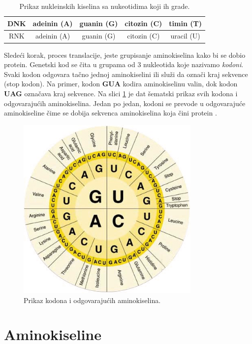 \begin{table}[H]
	\centering
	\begin{tabular}{|c|c|c|c|c|}
		\hline
		DNK & adeinin (A) & guanin (G) & citozin (C) & timin (T) \\
		\hline
		RNK & adeinin (A) & guanin (G) & citozin (C) & uracil (U) \\
		\hline             
	\end{tabular}
	\caption{Prikaz nukleinskih kiselina sa nukeotidima koji ih grade.}
	\label{tab: nucleotides}
\end{table}


Sledeći korak, proces translacije, jeste grupisanje aminokiselina kako bi se dobio protein. Genetski kod se čita u grupama od 3 nukleotida koje nazivamo \textit{kodoni}. Svaki kodon odgovara tačno jednoj aminokiselini ili služi da označi kraj sekvence (stop kodon). Na primer, kodon \textbf{GUA} kodira aminokiselinu valin, dok kodon \textbf{UAG} označava kraj sekvence. Na slici \ref{fig:codons} je dat šematski prikaz svih kodona i odgovarajućih aminokiselina. Jedan po jedan, kodoni se prevode u odgovarajuće aminokiseline čime se dobija sekvenca aminokiselina koja čini protein \cite{BMBG, synthesisOnl}.

\begin{figure}[h]
	\centering
	\includegraphics[width=0.8\textwidth]{Figures/codons_chart.png}
	\caption{Prikaz kodona i odgovarajućih aminokiselina.}
	\label{fig:codons}
\end{figure}


\section{Aminokiseline}


